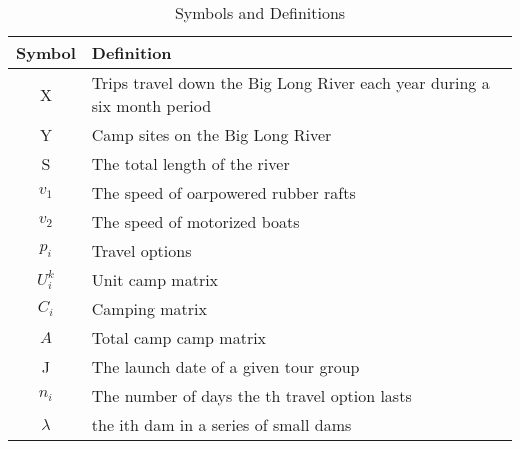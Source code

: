 \begin{table}[H]
	\begin{center}
	\caption{\label{tab:Symbols_total}Symbols and Definitions}
	\begin{tabular}{c p{13cm}}
	\toprule
		Symbol  & Deﬁnition \\
		\midrule
		X &  Trips travel down the Big Long River each year during a six month period \\
		Y &  Camp sites on the Big Long River \\
		S &  The total length of the river \\
		${v_1}$ &  The speed of oarpowered rubber rafts \\
		${v_2}$ &  The speed of motorized boats \\
		${p_i}$ &  Travel options \\
		$U_i^k$ &  Unit camp matrix \\
		${C_i}$ &  Camping matrix \\
		$A$ &  Total camp camp matrix \\
		J &  The launch date of a given tour group \\
		${n_i}$ &  The number of days the  th travel option lasts \\

		$\lambda $ &  the ith dam in a series of small dams \\
	\bottomrule
	\end{tabular}
\end{center}
\end{table}